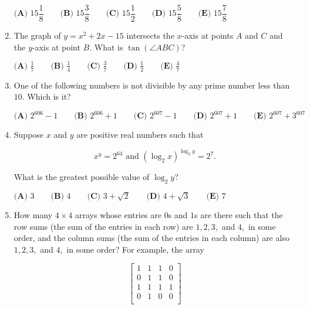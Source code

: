 \documentclass{article}
\begin{document}
\begin{enumerate}[label=\arabic*., itemsep=0.5em]
$\textbf{(A) }15\dfrac{1}{8}  \qquad
\textbf{(B) }15\dfrac{3}{8}  \qquad
\textbf{(C) }15\dfrac{1}{2}  \qquad
\textbf{(D) }15\dfrac{5}{8}  \qquad
\textbf{(E) }15\dfrac{7}{8} $\par \vspace{0.5em}\item The graph of $y=x^2+2x-15$ intersects the $x$-axis at points $A$ and $C$ and the $y$-axis at point $B$. What is $\tan(\angle ABC)$?

$\textbf{(A) }\frac{1}{7} \qquad \textbf{(B) }\frac{1}{4} \qquad \textbf{(C) }\frac{3}{7} \qquad \textbf{(D) }\frac{1}{2} \qquad \textbf{(E) }\frac{4}{7}$\par \vspace{0.5em}\item One of the following numbers is not divisible by any prime number less than $10.$ Which is it?

$\textbf{(A) } 2^{606}-1 \qquad\textbf{(B) } 2^{606}+1 \qquad\textbf{(C) } 2^{607}-1 \qquad\textbf{(D) } 2^{607}+1\qquad\textbf{(E) } 2^{607}+3^{607}$\par \vspace{0.5em}\item Suppose $x$ and $y$ are positive real numbers such that

\begin{equation*}
x^y=2^{64}\text{ and }(\log_2{x})^{\log_2{y}}=2^{7}.
\end{equation*}

What is the greatest possible value of $\log_2{y}$?

$\textbf{(A) }3 \qquad \textbf{(B) }4 \qquad \textbf{(C) }3+\sqrt{2} \qquad \textbf{(D) }4+\sqrt{3} \qquad \textbf{(E) }7$\par \vspace{0.5em}\item How many $4 \times 4$ arrays whose entries are $0$s and $1$s are there such that the row sums (the sum of the entries in each row) are $1, 2, 3,$ and $4,$ in some order, and the column sums (the sum of the entries in each column) are also $1, 2, 3,$ and $4,$ in some order? For example, the array

\begin{equation*}
\left[
  \begin{array}{cccc}
    1 & 1 & 1 & 0 \\
    0 & 1 & 1 & 0 \\
    1 & 1 & 1 & 1 \\
    0 & 1 & 0 & 0 \\
  \end{array}
\right]
\end{equation*}


\end{enumerate}
\end{document}
